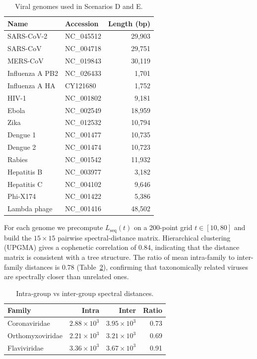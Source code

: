 \documentclass[12pt,a4paper]{article}
\begin{document}
\begin{table}[h]
\centering
\caption{Viral genomes used in Scenarios D and E.}
\label{tab:viruses}
\begin{tabular}{llr}
\toprule
Name & Accession & Length (bp) \\
\midrule
SARS-CoV-2      & NC\_045512 & 29,903 \\
SARS-CoV        & NC\_004718 & 29,751 \\
MERS-CoV        & NC\_019843 & 30,119 \\
Influenza A PB2 & NC\_026433 & 1,701 \\
Influenza A HA  & CY121680   & 1,752 \\
HIV-1           & NC\_001802 & 9,181 \\
Ebola           & NC\_002549 & 18,959 \\
Zika            & NC\_012532 & 10,794 \\
Dengue 1        & NC\_001477 & 10,735 \\
Dengue 2        & NC\_001474 & 10,723 \\
Rabies          & NC\_001542 & 11,932 \\
Hepatitis B     & NC\_003977 & 3,182 \\
Hepatitis C     & NC\_004102 & 9,646 \\
Phi-X174        & NC\_001422 & 5,386 \\
Lambda phage    & NC\_001416 & 48,502 \\
\bottomrule
\end{tabular}
\end{table}

For each genome we precompute $L_{\mathrm{seq}}(t)$ on a 200-point grid
$t \in [10, 80]$ and build the $15 \times 15$ pairwise spectral-distance
matrix.  Hierarchical clustering (UPGMA) gives a cophenetic correlation
of 0.84, indicating that the distance matrix is consistent with a tree
structure.  The ratio of mean intra-family to inter-family distances is
0.78 (Table~\ref{tab:d}), confirming that taxonomically related viruses
are spectrally closer than unrelated ones.

\begin{table}[h]
\centering
\caption{Intra-group vs inter-group spectral distances.}
\label{tab:d}
\begin{tabular}{lrrr}
\toprule
Family & Intra & Inter & Ratio \\
\midrule
Coronaviridae   & $2.88\times10^{3}$ & $3.95\times10^{3}$ & 0.73 \\
Orthomyxoviridae & $2.21\times10^{3}$ & $3.21\times10^{3}$ & 0.69 \\
Flaviviridae    & $3.36\times10^{3}$ & $3.67\times10^{3}$ & 0.91 \\
\bottomrule
\end{tabular}
\end{table}
\end{document}
